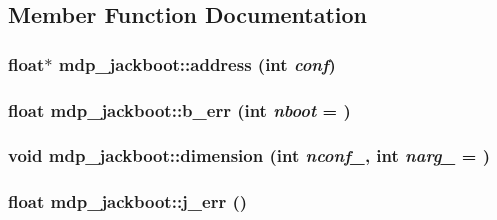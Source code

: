 \subsection{Member Function Documentation}
\hypertarget{classmdp__jackboot_a0eac202baa5532ede856af6f616ab9d9}{
\subsubsection[{address}]{\setlength{\rightskip}{0pt plus 5cm}float$\ast$ mdp\_\-jackboot::address (int {\em conf})}}
\label{classmdp__jackboot_a0eac202baa5532ede856af6f616ab9d9}
\hypertarget{classmdp__jackboot_a4d4841252e62815d7242cb440c6e49c0}{
\subsubsection[{b\_\-err}]{\setlength{\rightskip}{0pt plus 5cm}float mdp\_\-jackboot::b\_\-err (int {\em nboot} = {})}}
\label{classmdp__jackboot_a4d4841252e62815d7242cb440c6e49c0}
\hypertarget{classmdp__jackboot_a452de46122e421b055d02c381fc88c58}{
\subsubsection[{dimension}]{\setlength{\rightskip}{0pt plus 5cm}void mdp\_\-jackboot::dimension (int {\em nconf\_\-}, \/  int {\em narg\_\-} = {})}}
\label{classmdp__jackboot_a452de46122e421b055d02c381fc88c58}
\hypertarget{classmdp__jackboot_aa594e64f4e7155684e2d23f1f7ba2b5d}{
\subsubsection[{j\_\-err}]{\setlength{\rightskip}{0pt plus 5cm}float mdp\_\-jackboot::j\_\-err ()}}
